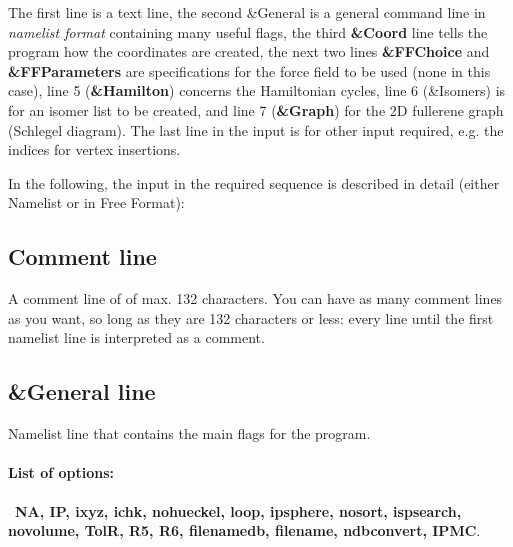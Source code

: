 \documentclass[article,a4paper,twoside]{memoir}
\newcommand{\paramname}[1]{{\color{green}\textbf{#1}}}
\begin{document}
The first line is a text line, the second \&General is a general
command line in \textit{namelist format} containing many useful flags,
the third \paramname{\&Coord} line tells the program how the
coordinates are created, the next two lines \paramname{\&FFChoice}
and \paramname{\&FFParameters} are specifications for the force field
to be used (none in this case), line 5 (\paramname{\&Hamilton})
concerns the Hamiltonian cycles, line 6 (\&Isomers) is for an isomer list
to be created, and line 7 (\paramname{\&Graph}) for the 2D fullerene
graph (Schlegel diagram). The last line in the input is for other input required, e.g.
the indices for vertex insertions.

In the following, the input in the required sequence is described in detail (either Namelist or in Free Format):

\subsection{Comment line} 
A comment line of of max. 132 characters. You can have as many comment lines as you want, so long as they are 132 characters or less: 
every line until the first namelist line is interpreted as a comment.

\subsection{\&General line}
Namelist line that contains the main flags for the program. 

\paragraph{List of options:}\  \paramname{NA, IP, ixyz, ichk, nohueckel, loop, ipsphere, nosort, ispsearch, novolume, TolR, R5, R6, filenamedb, filename, ndbconvert, IPMC}.
\end{document}
